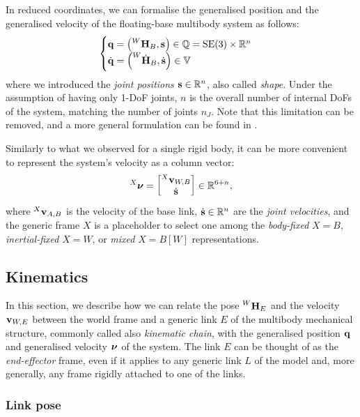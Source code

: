 In reduced coordinates, we can formalise the generalised position and the generalised velocity of the floating-base multibody system as follows:
%
\begin{equation*}
    \begin{cases}
        \Qu = \left(\homo[W]_B, \Shape\right) \in \mathbb{Q} = \SE(3) \times \realn^n \\
        \Qud = \left(\homod[W]_B, \Shaped\right) \in \mathbb{V}
    \end{cases}
\end{equation*}
%
where we introduced the \emph{joint positions} $\Shape \in \realn^n$, also called \emph{shape}.
Under the assumption of having only 1-\ac{DoF} joints, $n$ is the overall number of internal \aclp{DoF} of the system, matching the number of joints $n_J$.
Note that this limitation can be removed, and a more general formulation can be found in \parencite{featherstone_rigid_2008}.

Similarly to what we observed for a single rigid body, it can be more convenient to represent the system's velocity as a column vector:
%
\begin{equation*}
    \Nu[X] =
    \begin{bmatrix}
        \velsix[X]_{W,B} \\ \Shaped
    \end{bmatrix}
    \in \realn^{6+n}
    ,
\end{equation*}
%
where $\velsix[X]_{A,B}$ is the velocity of the base link, $\Shaped \in \realn^n$ are the \emph{joint velocities}, and the generic frame $X$ is a placeholder to select one among the \emph{body-fixed} $X=B$, \emph{inertial-fixed} $X=W$, or \emph{mixed} $X=B[W]$ representations.

\subsection{Kinematics}

In this section, we describe how we can relate the pose $\homo[W]_E$ and the velocity $\velsix_{W,E}$ between the world frame and a generic link $E$ of the multibody mechanical structure, commonly called also \emph{kinematic chain}, with the generalised position $\Qu$ and generalised velocity $\Nu$ of the system.
The link $E$ can be thought of as the \emph{end-effector} frame, even if it applies to any generic link $L$ of the model and, more generally, any frame rigidly attached to one of the links.

\subsubsection{Link pose}

